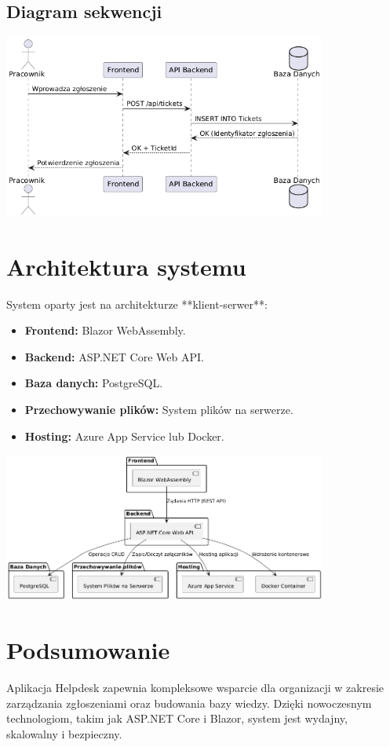 \documentclass[a4paper,12pt]{article}
\begin{document}
\subsection{Diagram sekwencji}
\begin{center}
\includegraphics[width=0.8\textwidth]{draw/diagramSekwencji.png}
\end{center}

\newpage

\section{Architektura systemu}
System oparty jest na architekturze **klient-serwer**:
\begin{itemize}
    \item \textbf{Frontend:} Blazor WebAssembly.
    \item \textbf{Backend:} ASP.NET Core Web API.
    \item \textbf{Baza danych:} PostgreSQL.
    \item \textbf{Przechowywanie plików:} System plików na serwerze.
    \item \textbf{Hosting:} Azure App Service lub Docker.
\end{itemize}

\begin{center}
\includegraphics[width=0.8\textwidth]{draw/diagramArchitektury.png}
\end{center}

\newpage

\section{Podsumowanie}
Aplikacja Helpdesk zapewnia kompleksowe wsparcie dla organizacji w zakresie zarządzania zgłoszeniami oraz budowania bazy wiedzy. Dzięki nowoczesnym technologiom, takim jak ASP.NET Core i Blazor, system jest wydajny, skalowalny i bezpieczny.
\end{document}
